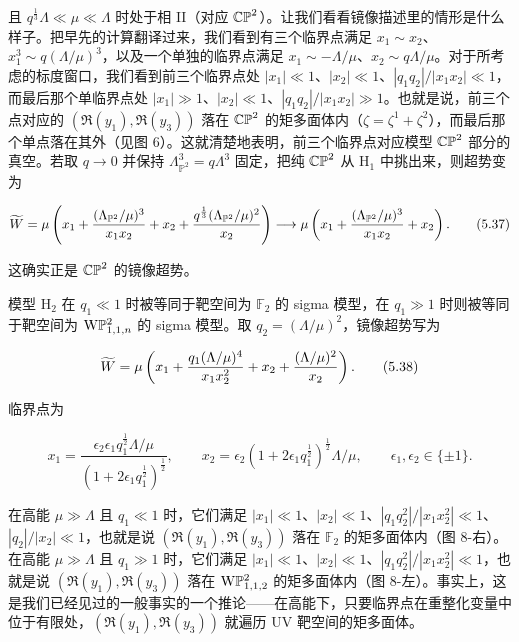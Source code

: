 且 $q^{\frac13}\Lambda\ll\mu\ll\Lambda$ 时处于相 II（对应 $\mathbb{CP}^2$）。让我们看看镜像描述里的情形是什么样子。把早先的计算翻译过来，我们看到有三个临界点满足 $x_1\sim x_2$、$x_1^3\sim q(\Lambda/\mu)^3$，以及一个单独的临界点满足 $x_1\sim-\Lambda/\mu$、$x_2\sim q\Lambda/\mu$。对于所考虑的标度窗口，我们看到前三个临界点处 $|x_1|\ll1$、$|x_2|\ll1$、$|q_1q_2|/|x_1x_2|\ll1$，而最后那个单临界点处 $|x_1|\gg1$、$|x_2|\ll1$、$|q_1q_2|/|x_1x_2|\gg1$。也就是说，前三个点对应的 $(\Re(y_1),\Re(y_3))$ 落在 $\mathbb{CP}^2$ 的矩多面体内（$\zeta=\zeta^1+\zeta^2$），而最后那个单点落在其外（见图 6）。这就清楚地表明，前三个临界点对应模型 $\mathbb{CP}^2$ 部分的真空。若取 $q\to0$ 并保持 $\Lambda_{\mathbb{P}^2}^3=q\Lambda^3$ 固定，把纯 $\mathbb{CP}^2$ 从 $\mathrm{H}_1$ 中挑出来，则超势变为

\begin{equation}
	\widetilde{W} = \mu\left(x_1+\frac{(\Lambda_{\mathbb{P}^2}/\mu)^3}{x_1x_2}+x_2+\frac{q^{\frac13}(\Lambda_{\mathbb{P}^2}/\mu)^2}{x_2}\right)\longrightarrow \mu\left(x_1+\frac{(\Lambda_{\mathbb{P}^2}/\mu)^3}{x_1x_2}+x_2\right). \tag{5.37}
\end{equation}

这确实正是 $\mathbb{CP}^2$ 的镜像超势。


模型 $\mathrm{H}_2$ 在 $q_1\ll1$ 时被等同于靶空间为 $\mathbb{F}_2$ 的 sigma 模型，在 $q_1\gg1$ 时则被等同于靶空间为 $\mathrm{W}\mathbb{P}^2_{1,1,n}$ 的 sigma 模型。取 $q_2=(\Lambda/\mu)^2$，镜像超势写为

\begin{equation}
	\widetilde{W} = \mu\left(x_1+\frac{q_1(\Lambda/\mu)^4}{x_1x_2^2}+x_2+\frac{(\Lambda/\mu)^2}{x_2}\right). \tag{5.38}
\end{equation}

临界点为

\begin{equation}
	x_1 = \frac{\epsilon_2\epsilon_1q_1^{\frac12}\Lambda/\mu}{(1+2\epsilon_1q_1^{\frac12})^{\frac12}},\qquad x_2 = \epsilon_2(1+2\epsilon_1q_1^{\frac12})^{\frac12}\Lambda/\mu,\qquad \epsilon_1,\epsilon_2\in\{\pm1\}. \tag{5.39}
\end{equation}

在高能 $\mu\gg\Lambda$ 且 $q_1\ll1$ 时，它们满足 $|x_1|\ll1$、$|x_2|\ll1$、$|q_1q_2^2|/|x_1x_2^2|\ll1$、$|q_2|/|x_2|\ll1$，也就是说 $(\Re(y_1),\Re(y_3))$ 落在 $\mathbb{F}_2$ 的矩多面体内（图 8-右）。在高能 $\mu\gg\Lambda$ 且 $q_1\gg1$ 时，它们满足 $|x_1|\ll1$、$|x_2|\ll1$、$|q_1q_2^2|/|x_1x_2^2|\ll1$，也就是说 $(\Re(y_1),\Re(y_3))$ 落在 $\mathrm{W}\mathbb{P}^2_{1,1,2}$ 的矩多面体内（图 8-左）。事实上，这是我们已经见过的一般事实的一个推论——在高能下，只要临界点在重整化变量中位于有限处，$(\Re(y_1),\Re(y_3))$ 就遍历 UV 靶空间的矩多面体。

